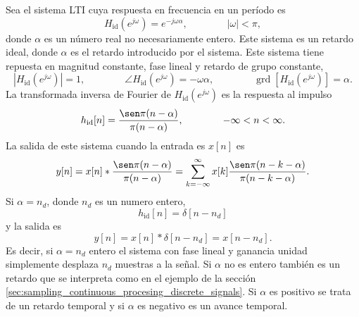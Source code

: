 \documentclass[a4paper]{report}
\DeclareMathOperator{\grd}{grd}
\begin{document}
Sea el sistema LTI cuya respuesta en frecuencia en un período es
\[
 H_\textrm{id}(e^{j\omega})=e^{-j\omega\alpha},
 \qquad\qquad 
 |\omega|<\pi,
\]
donde \(\alpha\) es un número real no necesariamente entero. Este sistema es un retardo ideal, donde \(\alpha\) es el retardo introducido por el sistema. Este sistema tiene repuesta en magnitud constante, fase lineal y retardo de grupo constante,
\[
 |H_\textrm{id}(e^{j\omega})|=1,
 \qquad\qquad 
 \angle H_\textrm{id}(e^{j\omega})=-\omega\alpha,
 \qquad\qquad
 \grd[H_\textrm{id}(e^{j\omega})]=\alpha. 
\]
La transformada inversa de Fourier de \(H_\textrm{id}(e^{j\omega})\) es la respuesta al impulso
\begin{equation}\label{eq:transform_analysis_ideal_delay_impulse_response}
 h_\textrm{id}[n]=\frac{\sen\pi(n-\alpha)}{\pi(n-\alpha)},
 \qquad\qquad 
 -\infty<n<\infty. 
\end{equation}
La salida de este sistema cuando la entrada es \(x[n]\) es
\[
 y[n]=x[n]*\frac{\sen\pi(n-\alpha)}{\pi(n-\alpha)}=\sum_{k=-\infty}^\infty x[k]\frac{\sen\pi(n-k-\alpha)}{\pi(n-k-\alpha)}.
\]
Si \(\alpha=n_d\), donde \(n_d\) es un numero entero,
\[
 h_\textrm{id}[n]=\delta[n-n_d]
\]
y la salida es
\[
 y[n]=x[n]*\delta[n-n_d]=x[n-n_d].
\]
Es decir, si \(\alpha=n_d\) entero el sistema con fase lineal y ganancia unidad simplemente desplaza \(n_d\) muestras a la señal. Si \(\alpha\) no es  entero también es un retardo que se interpreta como en el ejemplo de la sección \ref{sec:sampling_continuous_procesing_discrete_signals}. Si \(\alpha\) es positivo se trata de un retardo temporal y si \(\alpha\) es negativo es un avance temporal.
\end{document}
